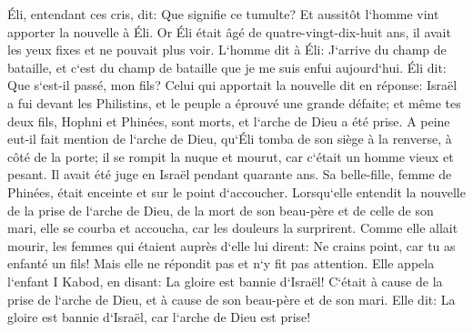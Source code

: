 \verse Éli, entendant ces cris, dit: Que signifie ce tumulte? Et aussitôt l`homme vint apporter la nouvelle à Éli. 
\verse Or Éli était âgé de quatre-vingt-dix-huit ans, il avait les yeux fixes et ne pouvait plus voir. 
\verse L`homme dit à Éli: J`arrive du champ de bataille, et c`est du champ de bataille que je me suis enfui aujourd`hui. Éli dit: Que s`est-il passé, mon fils? 
\verse Celui qui apportait la nouvelle dit en réponse: Israël a fui devant les Philistins, et le peuple a éprouvé une grande défaite; et même tes deux fils, Hophni et Phinées, sont morts, et l`arche de Dieu a été prise. 
\verse A peine eut-il fait mention de l`arche de Dieu, qu`Éli tomba de son siège à la renverse, à côté de la porte; il se rompit la nuque et mourut, car c`était un homme vieux et pesant. Il avait été juge en Israël pendant quarante ans. 
\verse Sa belle-fille, femme de Phinées, était enceinte et sur le point d`accoucher. Lorsqu`elle entendit la nouvelle de la prise de l`arche de Dieu, de la mort de son beau-père et de celle de son mari, elle se courba et accoucha, car les douleurs la surprirent. 
\verse Comme elle allait mourir, les femmes qui étaient auprès d`elle lui dirent: Ne crains point, car tu as enfanté un fils! Mais elle ne répondit pas et n`y fit pas attention. 
\verse Elle appela l`enfant I Kabod, en disant: La gloire est bannie d`Israël! C`était à cause de la prise de l`arche de Dieu, et à cause de son beau-père et de son mari. 
\verse Elle dit: La gloire est bannie d`Israël, car l`arche de Dieu est prise! 

\chapter{}

